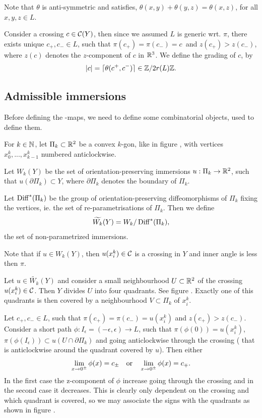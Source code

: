 Note that $\theta$ is anti-symmetric and satisfies, $\theta(x,y) +
\theta(y,z) = \theta(x,z)$, for all $x,y,z \in L$.

Consider a crossing $c \in \mathcal{C}(Y)$, then since we assumed $L$ is generic wrt.
$\pi$, there exists unique $c_+, c_- \in L$, such that $\pi(c_+) = \pi(c_-) =
c$ and $z(c_+) > z(c_-)$, where $z(c)$ denotes the $z$-component of $c$ in $\mathbb{R}^3$.
We define the grading of $c$, by 
\[ |c| = \lceil \theta(c^+, c^-) \rceil \in \mathbb{Z} / 2r(L) \mathbb{Z}. \]


\subsection{Admissible immersions}
Before defining the \Ainf-maps, we need to define some combinatorial objects,
used to define them.

For $k \in \mathbb{N}$, let $\Pi_k \subset \mathbb{R}^2$ be a convex $k$-gon, like in figure
, with vertices $x^k_0, ..., x^k_{k-1}$ numbered anticlockwise.


\begin{defn}
Let $W_k(Y)$ be the set of orientation-preserving immersions $u: \Pi_k \to \mathbb{R}^2$, 
such that $u(\partial \Pi_k) \subset Y$, where $\partial \Pi_k$ denotes the
boundary of $\Pi_k$. 

Let $\operatorname{Diff}^*(\Pi_k)$ be the group of
orientation-preserving diffeomorphisms of $\Pi_k$ fixing the vertices, ie. the
set of re-parametrisations of $\Pi_k$. Then we define 
\[ \widetilde{W_k}(Y) = W_k / \operatorname{Diff}^*(\Pi_k), \]
the set of non-parametrized immersions. 
\end{defn}
Note that if $u \in W_k(Y)$, then $u(x^k_i) \in \mathcal{C}$ is a crossing in $Y$ and inner
angle is less then $\pi$. 

Let $u\in \tilde{W_k}(Y)$ and consider
a small neighbourhood $U \subset \mathbb{R}^2$ of the crossing $u(x^k_i) \in \mathcal{C}$. Then
$Y$ divides $U$ into four quadrants. See figure . Exactly
one of this quadrants is then covered by a neighbourhood $V \subset \Pi_k$ of
$x^k_i$.

Let $c_+, c_- \in L$, such that $\pi(c_+) = \pi(c_-) = u(x^k_i)$ and
$z(c_+) > z(c_-)$. Consider a short path $\phi: I_\epsilon= (-\epsilon,
\epsilon) \to L$, such that  
$\pi(\phi(0)) = u(x^k_i)$, $\pi(\phi(I_\epsilon)) \subset u( U\cap \partial
\Pi_k)$ and going anticlockwise through the crossing ( that is anticlockwise
around the quadrant covered by $u$). Then either 
\[ \lim_{x\to 0^\pm} \phi(x) = c_\pm \quad\text{or}\quad \lim_{x\to 0^\pm} \phi(x) =
c_\mp. \] 
In the first case the z-component of $\phi$ increase going through the crossing
and in the second case it decreases. This is clearly only dependent on the
crossing and which quadrant is covered, so we may associate the signs with the
quadrants as shown in figure . 

